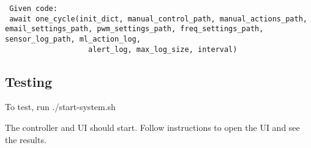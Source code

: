 \documentclass[
]{article}
\begin{document}
\begin{enumerate}
\begin{verbatim}
 Given code:
 await one_cycle(init_dict, manual_control_path, manual_actions_path, email_settings_path, pwm_settings_path, freq_settings_path, sensor_log_path, ml_action_log,
                   alert_log, max_log_size, interval)
\end{verbatim}
\end{enumerate}

\hypertarget{testing}{%
\subsection{Testing}\label{testing}}

To test, run ./start-system.sh

The controller and UI should start. Follow instructions to open the UI
and see the results.
\end{document}
